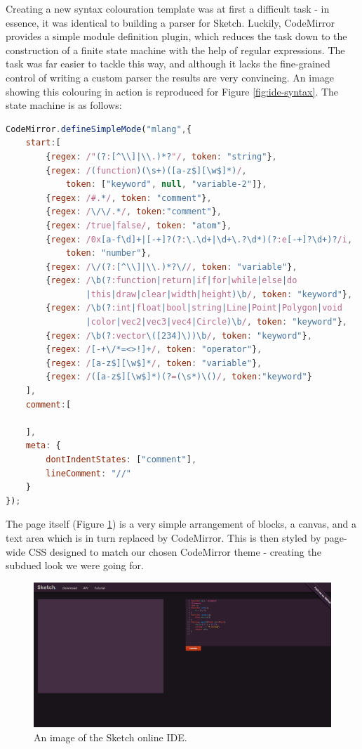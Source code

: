\documentclass{l3proj}
\begin{document}
Creating a new syntax colouration template was at first a difficult task - in essence, it was identical to building a parser for Sketch. Luckily, CodeMirror provides a simple module definition plugin, which reduces the task down to the construction of a finite state machine with the help of regular expressions. The task was far easier to tackle this way, and although it lacks the fine-grained control of writing a custom parser the results are very convincing. An image showing this colouring in action is reproduced for Figure \ref{fig:ide-syntax}. The state machine is as follows:
\lstset{%
      basicstyle=\ttfamily\footnotesize\bfseries,
      xleftmargin=.05\textwidth, xrightmargin=.05\textwidth,
      captionpos=b,
      tabsize=4
    }
\begin{lstlisting}[caption={Syntax Highlighting State Machine},label={lst:ide-fsm},language=JavaScript]
CodeMirror.defineSimpleMode("mlang",{
    start:[
        {regex: /"(?:[^\\]|\\.)*?"/, token: "string"},
		{regex: /(function)(\s+)([a-z$][\w$]*)/,
			token: ["keyword", null, "variable-2"]},
		{regex: /#.*/, token: "comment"},
		{regex: /\/\/.*/, token:"comment"},
		{regex: /true|false/, token: "atom"},
		{regex: /0x[a-f\d]+|[-+]?(?:\.\d+|\d+\.?\d*)(?:e[-+]?\d+)?/i,
			token: "number"},
		{regex: /\/(?:[^\\]|\\.)*?\//, token: "variable"},
		{regex: /\b(?:function|return|if|for|while|else|do
				|this|draw|clear|width|height)\b/, token: "keyword"},
		{regex: /\b(?:int|float|bool|string|Line|Point|Polygon|void
				|color|vec2|vec3|vec4|Circle)\b/, token: "keyword"},
		{regex: /\b(?:vector\([234]\))\b/, token: "keyword"},
		{regex: /[-+\/*=<>!]+/, token: "operator"},
		{regex: /[a-z$][\w$]*/, token: "variable"},
		{regex: /([a-z$][\w$]*)(?=(\s*)\()/, token:"keyword"}
    ],
    comment:[

    ],
    meta: {
        dontIndentStates: ["comment"],
        lineComment: "//"
    }
});
\end{lstlisting}

The page itself (Figure \ref{fig:ide-full}) is a very simple arrangement of blocks, a canvas, and a text area which is in turn replaced by CodeMirror. This is then styled by page-wide CSS designed to match our chosen CodeMirror theme - creating the subdued look we were going for.

\begin{figure}[!h]
\centering
\includegraphics[width=\textwidth]{images/sketch-ide}
\caption{An image of the Sketch online IDE.}
\label{fig:ide-full}
\end{figure}
\end{document}
